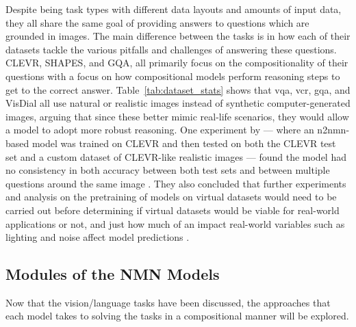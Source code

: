 Despite being task types with different data layouts and amounts of input data, they all share the same goal of providing answers to questions which are grounded in images.
The main difference between the tasks is in how each of their datasets tackle the various pitfalls and challenges of answering these questions.
CLEVR, SHAPES, and GQA, all primarily focus on the compositionality of their questions with a focus on how compositional models perform reasoning steps to get to the correct answer\cite{andreas_neural_2016,johnson_clevr_2016,hudson_gqa_2019}.
Table~\ref{tab:dataset_stats} shows that \gls{vqa}, \gls{vcr}, \gls{gqa}, and VisDial all use natural or realistic images instead of synthetic computer-generated images, arguing that since these better mimic real-life scenarios, they would allow a model to adopt more robust reasoning\cite{agrawal_vqa_2016,hudson_gqa_2019,zellers_recognition_2019,das_visual_2019}.
One experiment by \cite{sejnova_compositional_2018} --- where an \gls{n2nmn}-based model was trained on CLEVR and then tested on both the CLEVR test set and a custom dataset of CLEVR-like realistic images --- found the model had no consistency in both accuracy between both test sets and between multiple questions around the same image \cite{sejnova_compositional_2018}.
They also concluded that further experiments and analysis on the pretraining of models on virtual datasets would need to be carried out before determining if virtual datasets would be viable for real-world applications or not, and just how much of an impact real-world variables such as lighting and noise affect model predictions \cite{sejnova_compositional_2018}.

\subsection{Modules of the NMN Models}
\label{subsec:modules_of_the_nmn_models}

Now that the vision/language tasks have been discussed, the approaches that each model takes to solving the tasks in a compositional manner will be explored.

